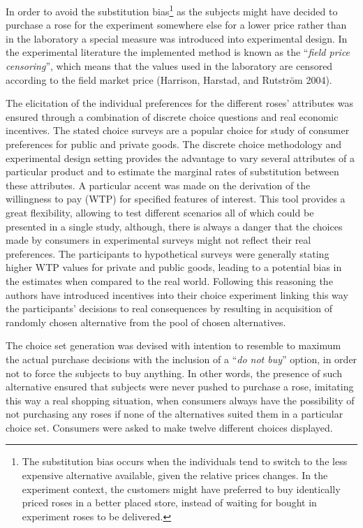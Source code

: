 \documentclass[12pt,]{article}
\let\rmarkdownfootnote\footnote%
\def\footnote{\protect\rmarkdownfootnote}
\begin{document}
In order to avoid the substitution bias\footnote{The substitution bias
  occurs when the individuals tend to switch to the less expensive
  alternative available, given the relative prices changes. In the
  experiment context, the customers might have preferred to buy
  identically priced roses in a better placed store, instead of waiting
  for bought in experiment roses to be delivered.} as the subjects might
have decided to purchase a rose for the experiment somewhere else for a
lower price rather than in the laboratory a special measure was
introduced into experimental design. In the experimental literature the
implemented method is known as the ``\emph{field price censoring}'',
which means that the values used in the laboratory are censored
according to the field market price (Harrison, Harstad, and Rutström
2004).

The elicitation of the individual preferences for the different roses'
attributes was ensured through a combination of discrete choice
questions and real economic incentives. The stated choice surveys are a
popular choice for study of consumer preferences for public and private
goods. The discrete choice methodology and experimental design setting
provides the advantage to vary several attributes of a particular
product and to estimate the marginal rates of substitution between these
attributes. A particular accent was made on the derivation of the
willingness to pay (WTP) for specified features of interest. This tool
provides a great flexibility, allowing to test different scenarios all
of which could be presented in a single study, although, there is always
a danger that the choices made by consumers in experimental surveys
might not reflect their real preferences. The participants to
hypothetical surveys were generally stating higher WTP values for
private and public goods, leading to a potential bias in the estimates
when compared to the real world. Following this reasoning the authors
have introduced incentives into their choice experiment linking this way
the participants' decisions to real consequences by resulting in
acquisition of randomly chosen alternative from the pool of chosen
alternatives.

The choice set generation was devised with intention to resemble to
maximum the actual purchase decisions with the inclusion of a ``\emph{do
not buy}'' option, in order not to force the subjects to buy anything.
In other words, the presence of such alternative ensured that subjects
were never pushed to purchase a rose, imitating this way a real shopping
situation, when consumers always have the possibility of not purchasing
any roses if none of the alternatives suited them in a particular choice
set. Consumers were asked to make twelve different choices displayed.
\end{document}
